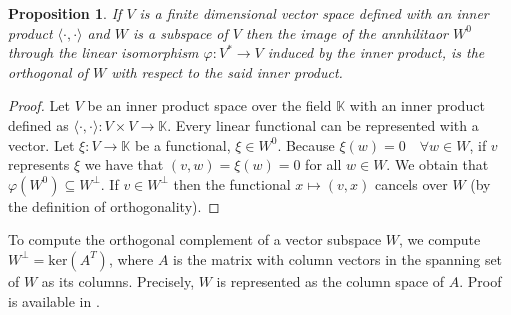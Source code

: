 \documentclass{article}
\theoremstyle{plain}%
\newtheorem{prop}[thm]{Proposition}
\theoremstyle{definition}
\theoremstyle{remark}
\def\K{\mathbb{K}}
\newcommand{\mker}[1]{\text{ker}\left(#1\right)}
\begin{document}
\begin{prop}
  If $V$ is a finite dimensional vector space defined with an inner product
  $\langle \cdot , \cdot \rangle$ and $W$ is a subspace of $V$
  then the image of the annhilitaor $W^0$ through the linear 
  isomorphism $\varphi: V^* \to V$ induced by the inner product, 
  is the orthogonal of $W$ with respect to the said inner product.
\end{prop}

\begin{proof}
  Let $V$ be an inner product space over the field $\K$ with an inner product defined as
  $\langle \cdot , \cdot \rangle : V \times V \to \K$. 
  Every linear functional can be 
  represented with a vector. Let $\xi : V \to \K$ be a functional, 
  $\xi \in  W^0$. Because $\xi(w)=0 \quad \forall  w \in W$, 
  if $v$ represents $\xi$ we have that $(v, w)=\xi(w)=0$ for all $w \in W$. 
  We obtain that $\varphi(W^0) \subseteq W^{\perp}$.
  If $v \in W^\perp$  
  then the functional $x \mapsto (v, x)$ cancels over $W$ 
  (by the definition of orthogonality).
\end{proof}


To compute the orthogonal complement of a vector subspace $W$, we
compute $W^\perp = \mker{A^T}$, where $A$ is the matrix with 
column vectors in the spanning set of $W$ as its columns. Precisely, $W$ is 
represented as the 
column space of $A$. Proof is available in \cite{ila}.






\end{document}
